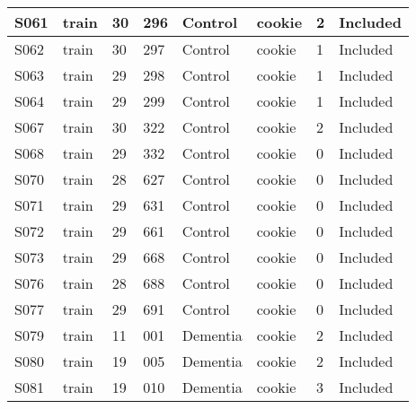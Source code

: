 \begin{center}
\begin{longtable}{|l|l|l|l|l|l|l|l|}
S061           & train                 & 30              & 296     & Control        & cookie          & 2            & Included      \\ \hline
S062           & train                 & 30              & 297     & Control        & cookie          & 1            & Included      \\ \hline
S063           & train                 & 29              & 298     & Control        & cookie          & 1            & Included      \\ \hline
S064           & train                 & 29              & 299     & Control        & cookie          & 1            & Included      \\ \hline
S067           & train                 & 30              & 322     & Control        & cookie          & 2            & Included      \\ \hline
S068           & train                 & 29              & 332     & Control        & cookie          & 0            & Included      \\ \hline
S070           & train                 & 28              & 627     & Control        & cookie          & 0            & Included      \\ \hline
S071           & train                 & 29              & 631     & Control        & cookie          & 0            & Included      \\ \hline
S072           & train                 & 29              & 661     & Control        & cookie          & 0            & Included      \\ \hline
S073           & train                 & 29              & 668     & Control        & cookie          & 0            & Included      \\ \hline
S076           & train                 & 28              & 688     & Control        & cookie          & 0            & Included      \\ \hline
S077           & train                 & 29              & 691     & Control        & cookie          & 0            & Included      \\ \hline
S079           & train                 & 11              & 001     & Dementia       & cookie          & 2            & Included      \\ \hline
S080           & train                 & 19              & 005     & Dementia       & cookie          & 2            & Included      \\ \hline
S081           & train                 & 19              & 010     & Dementia       & cookie          & 3            & Included      \\ \hline

\end{longtable}
\end{center}
